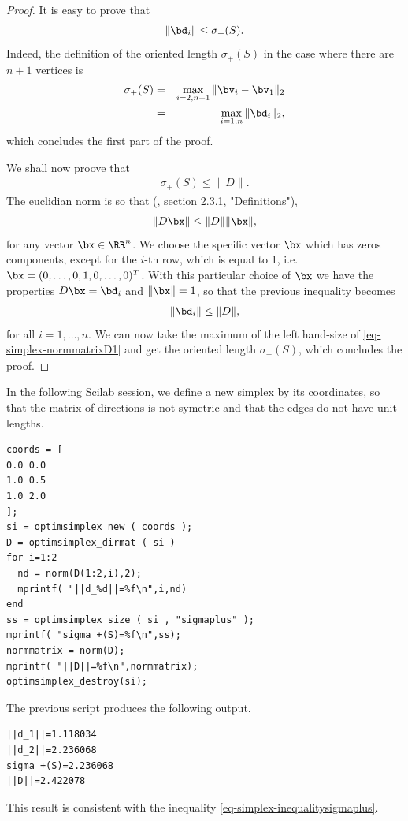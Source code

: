 \begin{proof}
It is easy to prove that 
\begin{eqnarray}
\|\bd_i\| \leq \sigma_+(S).
\end{eqnarray}
Indeed, the definition of the oriented length $\sigma_+(S)$
in the case where there are $n+1$ vertices is 
\begin{eqnarray}
\label{eq-simplex-sigma-np1}
\sigma_+(S) &=& \max_{i=2,n+1} \|\bv_i - \bv_1\|_2 \\
& = & \max_{i=1,n} \|\bd_i\|_2,
\end{eqnarray}
which concludes the first part of the proof.

We shall now proove that 
\begin{eqnarray}
\sigma_+(S) \leq \|D\|.
\end{eqnarray}
The euclidian norm is so that (\cite{citeulike:2122238}, section 2.3.1, "Definitions"),
\begin{eqnarray}
\|D \bx\| \leq \|D\| \|\bx\|,
\end{eqnarray}
for any vector $\bx\in\RR^n$. We choose the specific 
vector $\bx$ which has zeros components, except for the $i$-th row,
which is equal to 1, i.e. $\bx=(0,\ldots,0,1,0,\ldots,0)^T$.
With this particular choice of $\bx$ we have the properties $D\bx = \bd_i$
and $\|\bx\| = 1$, so that the previous inequality becomes
\begin{eqnarray}
\label{eq-simplex-normmatrixD1}
\|\bd_i\| \leq \|D\|,
\end{eqnarray}
for all $i=1,\ldots,n$.
We can now take the maximum of the left hand-size of \ref{eq-simplex-normmatrixD1}
and get the oriented length $\sigma_+(S)$, which 
concludes the proof.
\end{proof}

\begin{example}
In the following Scilab session, we define a new simplex 
by its coordinates, so that the matrix of directions 
is not symetric and that the edges do not have unit 
lengths.
\lstset{language=scilabscript}
\begin{lstlisting}
coords = [
0.0 0.0
1.0 0.5
1.0 2.0
];
si = optimsimplex_new ( coords );
D = optimsimplex_dirmat ( si )
for i=1:2
  nd = norm(D(1:2,i),2);
  mprintf( "||d_%d||=%f\n",i,nd)
end
ss = optimsimplex_size ( si , "sigmaplus" );
mprintf( "sigma_+(S)=%f\n",ss);
normmatrix = norm(D);
mprintf( "||D||=%f\n",normmatrix);
optimsimplex_destroy(si);
\end{lstlisting}
The previous script produces the following output.
\lstset{language=scilabscript}
\begin{lstlisting}
||d_1||=1.118034
||d_2||=2.236068
sigma_+(S)=2.236068
||D||=2.422078
\end{lstlisting}
This result is consistent with the inequality \ref{eq-simplex-inequalitysigmaplus}.
\end{example}

